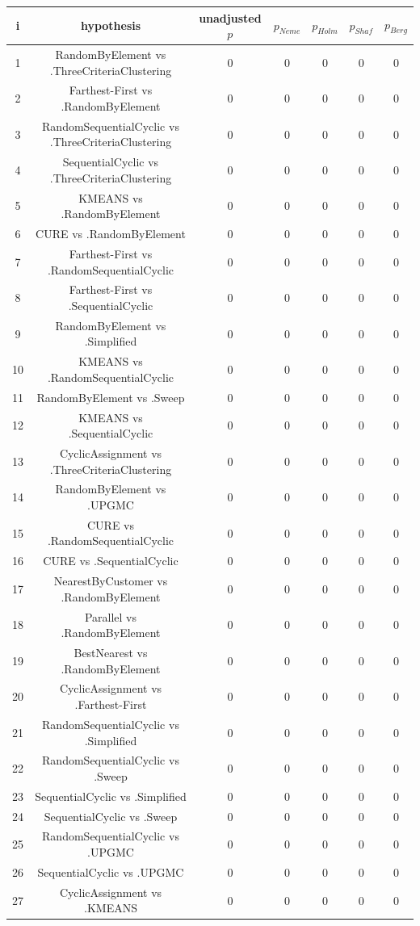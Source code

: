 \documentclass[a4paper,10pt]{article}
\begin{document}
\begin{landscape}
\begin{table}[!htp]
\centering\scriptsize
\begin{tabular}{ccccccc}
i&hypothesis&unadjusted $p$&$p_{Neme}$&$p_{Holm}$&$p_{Shaf}$&$p_{Berg}$\\
\hline1&RandomByElement vs .ThreeCriteriaClustering&0&0&0&0&0\\
2&Farthest-First vs .RandomByElement&0&0&0&0&0\\
3&RandomSequentialCyclic vs .ThreeCriteriaClustering&0&0&0&0&0\\
4&SequentialCyclic vs .ThreeCriteriaClustering&0&0&0&0&0\\
5&KMEANS vs .RandomByElement&0&0&0&0&0\\
6&CURE vs .RandomByElement&0&0&0&0&0\\
7&Farthest-First vs .RandomSequentialCyclic&0&0&0&0&0\\
8&Farthest-First vs .SequentialCyclic&0&0&0&0&0\\
9&RandomByElement vs .Simplified&0&0&0&0&0\\
10&KMEANS vs .RandomSequentialCyclic&0&0&0&0&0\\
11&RandomByElement vs .Sweep&0&0&0&0&0\\
12&KMEANS vs .SequentialCyclic&0&0&0&0&0\\
13&CyclicAssignment vs .ThreeCriteriaClustering&0&0&0&0&0\\
14&RandomByElement vs .UPGMC&0&0&0&0&0\\
15&CURE vs .RandomSequentialCyclic&0&0&0&0&0\\
16&CURE vs .SequentialCyclic&0&0&0&0&0\\
17&NearestByCustomer vs .RandomByElement&0&0&0&0&0\\
18&Parallel vs .RandomByElement&0&0&0&0&0\\
19&BestNearest vs .RandomByElement&0&0&0&0&0\\
20&CyclicAssignment vs .Farthest-First&0&0&0&0&0\\
21&RandomSequentialCyclic vs .Simplified&0&0&0&0&0\\
22&RandomSequentialCyclic vs .Sweep&0&0&0&0&0\\
23&SequentialCyclic vs .Simplified&0&0&0&0&0\\
24&SequentialCyclic vs .Sweep&0&0&0&0&0\\
25&RandomSequentialCyclic vs .UPGMC&0&0&0&0&0\\
26&SequentialCyclic vs .UPGMC&0&0&0&0&0\\
27&CyclicAssignment vs .KMEANS&0&0&0&0&0\\

\end{tabular}
\end{table}
\end{landscape}
\end{document}
